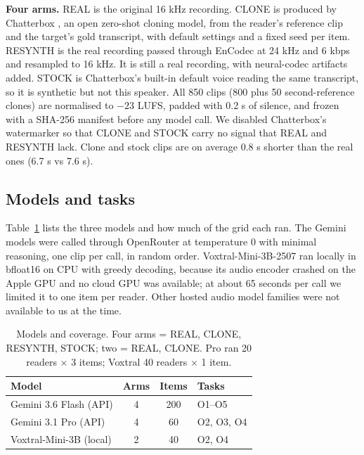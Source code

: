 \textbf{Four arms.} REAL is the original 16 kHz recording. CLONE is produced by Chatterbox \citep{chatterbox}, an open zero-shot cloning model, from the reader's reference clip and the target's gold transcript, with default settings and a fixed seed per item. RESYNTH is the real recording passed through EnCodec at 24 kHz and 6 kbps \citep{a2210_13438} and resampled to 16 kHz. It is still a real recording, with neural-codec artifacts added. STOCK is Chatterbox's built-in default voice reading the same transcript, so it is synthetic but not this speaker. All 850 clips (800 plus 50 second-reference clones) are normalised to $-23$ LUFS, padded with 0.2 s of silence, and frozen with a SHA-256 manifest before any model call. We disabled Chatterbox's watermarker so that CLONE and STOCK carry no signal that REAL and RESYNTH lack. Clone and stock clips are on average 0.8 s shorter than the real ones (6.7 s vs 7.6 s).

\subsection{Models and tasks}

Table~\ref{tab:models} lists the three models and how much of the grid each ran. The Gemini models were called through OpenRouter at temperature 0 with minimal reasoning, one clip per call, in random order. Voxtral-Mini-3B-2507 \citep{a2507_13264} ran locally in bfloat16 on CPU with greedy decoding, because its audio encoder crashed on the Apple GPU and no cloud GPU was available; at about 65 seconds per call we limited it to one item per reader. Other hosted audio model families were not available to us at the time.

\begin{table}[t]
\small
\centering
\begin{tabular}{lccl}
\toprule
Model & Arms & Items & Tasks \\
\midrule
Gemini 3.6 Flash (API) & 4 & 200 & O1--O5 \\
Gemini 3.1 Pro (API) & 4 & 60 & O2, O3, O4 \\
Voxtral-Mini-3B (local) & 2 & 40 & O2, O4 \\
\bottomrule
\end{tabular}
\caption{Models and coverage. Four arms = REAL, CLONE, RESYNTH, STOCK; two = REAL, CLONE. Pro ran 20 readers $\times$ 3 items; Voxtral 40 readers $\times$ 1 item.}
\label{tab:models}
\end{table}

